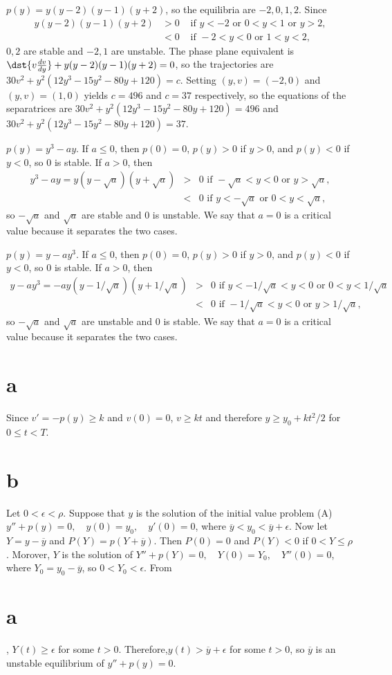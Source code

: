 \documentclass[dvips]{book}
\renewcommand{\exer}[1]{\par\medskip\;\noindent{\color{red}\bf #1.}}
\numberwithin{example}{section}
\numberwithin{equation}{section}
\numberwithin{theorem}{section}
\numberwithin{table}{section}
\numberwithin{figure}{section}
\begin{document}
\exer{4.4.8}
$p(y)=y(y-2)(y-1)(y+2)$, so the
 equilibria are $-2,0,1,2$.
Since
$$
\begin{array}{rcl}
y(y-2)(y-1)(y+2)&>0& \mbox{ if } y<-2\mbox{ or }0<y<1\mbox{ or }
y>2,\\
&<0&\mbox{ if }-2<y<0\mbox{ or }1<y<2,
\end{array}
$$
$0,2$ are stable and $-2,1$ are unstable. The phase plane
equivalent is
$\dst{v{dv\over dy}}+y(y-2)(y-1)(y+2)=0$, so the trajectories are
$30v^2+y^2(12y^3-15y^2-80y+120)=c$. Setting $(y,v)=(-2,0)$
and $(y,v)=(1,0)$
yields
$c=496$ and $c=37$ respectively, so the equations of the separatrices
are $30v^2+y^2(12y^3-15y^2-80y+120)=496$
and $30v^2+y^2(12y^3-15y^2-80y+120)=37$.


\exer{4.4.10}
$p(y)=y^3-ay$.
If $a\le0$, then $p(0)=0$, $p(y)>0$ if $y>0$, and $p(y)<0$ if $y<0$, so
$0$ is  stable.
 If $a>0$, then
\begin{eqnarray*}
y^3-ay=y(y-\sqrt a)(y+\sqrt a)&>&0\mbox{ if }-\sqrt a<y<0\mbox{ or }
y>\sqrt a,\\
&<&0\mbox{ if }y<-\sqrt a\mbox{ or }0<y<\sqrt a,
\end{eqnarray*}
so $-\sqrt a$ and $\sqrt a$ are  stable  and $0$
is unstable. We say that $a=0$ is a critical value
because  it separates the two cases.



\exer{4.4.12}
$p(y)=y-ay^3$. If $a\le0$, then $p(0)=0$, $p(y)>0$ if $y>0$, and
$p(y)<0$ if $y<0$, so $0$ is stable. If $a>0$, then
\begin{eqnarray*}
y-ay^3=-ay(y-1/\sqrt a)(y+1/\sqrt a)&>&0\mbox{ if }y<-1/\sqrt
a<y<0\mbox{ or } 0<y<1/\sqrt a\\
&<&0\mbox{ if }-1/\sqrt a<y<0\mbox{ or }y>1/\sqrt a,
\end{eqnarray*}
so $-\sqrt a$ and $\sqrt a$ are unstable and $0$ is stable. We say
that $a=0$ is a critical value because it separates the two cases.



\exer{4.4.24}
\part{a} Since $v'=-p(y)\ge k$ and $v(0)=0$, $v\ge kt$ and therefore
$y\ge y_0+kt^2/2$ for $0\le t<T$.

\part{b}
Let $0<\epsilon<\rho$.
Suppose that $y$ is the solution of the initial value problem
(A) $y''+p(y)=0,\quad y(0)=y_0,\quad y'(0)=0$, where $\overline
y<y_0<\overline y+\epsilon$. Now let $Y=y-\overline y$ and
$P(Y)=p(Y+\overline y)$. Then $P(0)=0$ and $P(Y)<0$ if
$0<Y\le\rho$ . Morover, $Y$ is the solution of
 $Y''+p(Y)=0,\quad Y(0)=Y_0,\quad Y''(0)=0$, where $Y_0=y_0-\overline
y$, so $0<Y_0<\epsilon$. From \part{a}, $Y(t)\ge\epsilon$ for some
$t>0$. Therefore,$y(t)>\overline y+\epsilon$ for some $t>0$,
so $\overline y$ is an unstable equilibrium of $y''+p(y)=0$.
\end{document}
